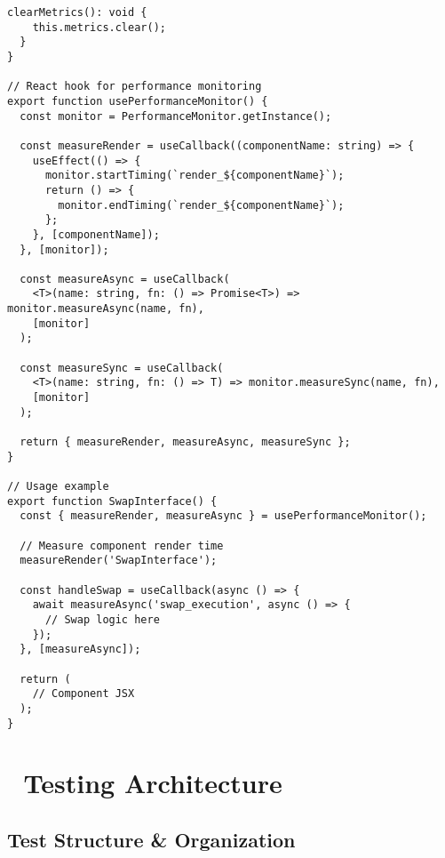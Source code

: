\documentclass[11pt,a4paper]{article}
\begin{document}
\begin{lstlisting}[style=typescript, caption=Performance Monitoring Implementation]
  clearMetrics(): void {
    this.metrics.clear();
  }
}

// React hook for performance monitoring
export function usePerformanceMonitor() {
  const monitor = PerformanceMonitor.getInstance();
  
  const measureRender = useCallback((componentName: string) => {
    useEffect(() => {
      monitor.startTiming(`render_${componentName}`);
      return () => {
        monitor.endTiming(`render_${componentName}`);
      };
    }, [componentName]);
  }, [monitor]);
  
  const measureAsync = useCallback(
    <T>(name: string, fn: () => Promise<T>) => monitor.measureAsync(name, fn),
    [monitor]
  );
  
  const measureSync = useCallback(
    <T>(name: string, fn: () => T) => monitor.measureSync(name, fn),
    [monitor]
  );
  
  return { measureRender, measureAsync, measureSync };
}

// Usage example
export function SwapInterface() {
  const { measureRender, measureAsync } = usePerformanceMonitor();
  
  // Measure component render time
  measureRender('SwapInterface');
  
  const handleSwap = useCallback(async () => {
    await measureAsync('swap_execution', async () => {
      // Swap logic here
    });
  }, [measureAsync]);
  
  return (
    // Component JSX
  );
}
\end{lstlisting}

\section{🧪 Testing Architecture}

\subsection{Test Structure & Organization}
\end{document}
